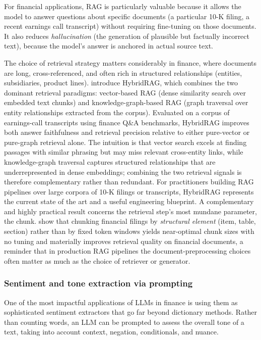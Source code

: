 For financial applications, RAG is particularly valuable because it allows the model to answer questions about specific documents (a particular 10-K filing, a recent earnings call transcript) without requiring fine-tuning on those documents. It also reduces \textit{hallucination} (the generation of plausible but factually incorrect text), because the model's answer is anchored in actual source text.

The choice of retrieval strategy matters considerably in finance, where documents are long, cross-referenced, and often rich in structured relationships (entities, subsidiaries, product lines). \cite{sarmah2024hybridrag} introduce HybridRAG, which combines the two dominant retrieval paradigms: vector-based RAG (dense similarity search over embedded text chunks) and knowledge-graph-based RAG (graph traversal over entity relationships extracted from the corpus). Evaluated on a corpus of earnings-call transcripts using finance Q\&A benchmarks, HybridRAG improves both answer faithfulness and retrieval precision relative to either pure-vector or pure-graph retrieval alone. The intuition is that vector search excels at finding passages with similar phrasing but may miss relevant cross-entity links, while knowledge-graph traversal captures structured relationships that are underrepresented in dense embeddings; combining the two retrieval signals is therefore complementary rather than redundant. For practitioners building RAG pipelines over large corpora of 10-K filings or transcripts, HybridRAG represents the current state of the art and a useful engineering blueprint. A complementary and highly practical result concerns the retrieval step's most mundane parameter, the chunk. \cite{jimenoyepes2024chunking} show that chunking financial filings by \textit{structural element} (item, table, section) rather than by fixed token windows yields near-optimal chunk sizes with no tuning and materially improves retrieval quality on financial documents, a reminder that in production RAG pipelines the document-preprocessing choices often matter as much as the choice of retriever or generator.

\subsubsection{Sentiment and tone extraction via prompting}

One of the most impactful applications of LLMs in finance is using them as sophisticated sentiment extractors that go far beyond dictionary methods. Rather than counting words, an LLM can be prompted to assess the overall tone of a text, taking into account context, negation, conditionals, and nuance.

